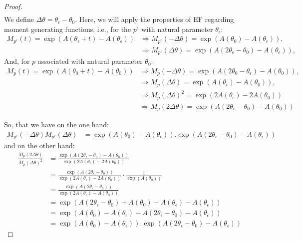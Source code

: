 \begin{proof}
\begin{align*}
\end{align*}
We define $\Delta \theta = \theta_\epsilon - \theta_0$. Here, we will apply the properties of EF regarding moment generating functions, i.e., for the $p^\epsilon$ with natural parameter $\theta_\epsilon$:
\begin{align*}    
    M_{p^\epsilon}(t) = \exp\left(A(\theta_\epsilon + t) - A(\theta_\epsilon)\right)
    &\Rightarrow 
    M_{p^\epsilon}(-\Delta \theta) = \exp\left(A(\theta_0) - A(\theta_\epsilon)\right),\\
    &\Rightarrow M_{p^\epsilon}(\Delta \theta) = \exp\left(A(2\theta_\epsilon-\theta_0) - A(\theta_\epsilon)\right),
\end{align*}
And, for $p$ associated with natural parameter $\theta_0$:
\begin{align*}    
    M_{p}(t) = \exp\left(A(\theta_0 + t) - A(\theta_0)\right)
    &\Rightarrow 
    M_{p}(-\Delta \theta) 
        = \exp\left(A(2\theta_0-\theta_\epsilon) - A(\theta_0)\right),\\
    &\Rightarrow 
    M_{p}(\Delta \theta) 
        = \exp\left(A(\theta_\epsilon) - A(\theta_0)\right),\\
    &\Rightarrow 
     M_{p}(\Delta \theta)^2
        = \exp\left(2A(\theta_\epsilon) - 2A(\theta_0)\right)\\  
    &\Rightarrow 
     M_{p}(2\Delta \theta) 
        = \exp\left(A(2\theta_\epsilon - \theta_0) - A(\theta_0)\right)
\end{align*}

So, that we have on the one hand:
\begin{align*}
M_{p^\epsilon}(-\Delta \theta)M_{p^\epsilon}(\Delta \theta)
    &= \exp\left(A(\theta_0) - A(\theta_\epsilon)\right).  
        \exp\left(A(2\theta_\epsilon-\theta_0) - A(\theta_\epsilon)\right)
    \end{align*}
and on the other hand:
\begin{align*}
    \frac{M_{p}(2\Delta \theta)}{M_{p}(\Delta \theta)^2}
        &= \frac{\exp\left(A(2\theta_\epsilon - \theta_0) - A(\theta_0)\right)}{\exp\left(2A(\theta_\epsilon) - 2A(\theta_0)\right)}\\
        &= \frac{\exp\left(A(2\theta_\epsilon - \theta_0)\right)}{\exp\left(2A(\theta_\epsilon) - 2A(\theta_0)\right)} \cdot \frac{1}{\exp\left(A(\theta_0)\right)}\\
        &= \frac{\exp\left(A(2\theta_\epsilon - \theta_0)\right)}{\exp\left(2A(\theta_\epsilon) - A(\theta_0)\right)}\\
        &= \exp\left(A(2\theta_\epsilon - \theta_0) +A(\theta_0) -  A(\theta_\epsilon) - A(\theta_\epsilon)\right)\\
        &= \exp\left(A(\theta_0) -  A(\theta_\epsilon) + A(2\theta_\epsilon - \theta_0) - A(\theta_\epsilon)\right)\\
        &= \exp\left(A(\theta_0) -  A(\theta_\epsilon)\right).\exp\left( A(2\theta_\epsilon - \theta_0) - A(\theta_\epsilon)\right)
\end{align*}


\end{proof}
